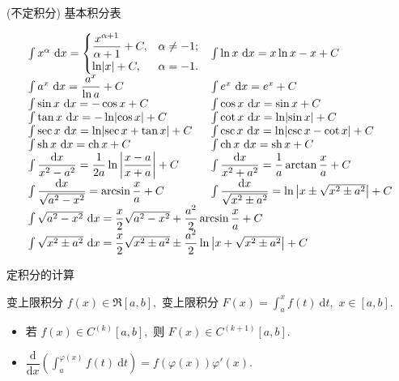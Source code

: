 \begin{frame}{(不定积分) 基本积分表}

{\smaller[2]
\[
\begin{array}{ll}
\int x^\alpha ~ \mathrm{d} x = \begin{cases}
\dfrac{x^{\alpha+1}}{\alpha+1} + C, & \alpha \neq -1;\\
\ln \lvert x \rvert + C, & \alpha = -1.
\end{cases} & \int \ln x ~ \mathrm{d} x = x \ln x - x + C \\
\int a^x ~ \mathrm{d} x = \dfrac{a^x}{\ln a} + C & \int e^x ~ \mathrm{d} x = e^x + C \\
\int \sin x ~ \mathrm{d} x = -\cos x + C & \int \cos x ~ \mathrm{d} x = \sin x + C \\
\int \tan x ~ \mathrm{d} x = -\ln \lvert \cos x \rvert + C & \int \cot x ~ \mathrm{d} x = \ln \lvert \sin x \rvert + C \\
\int \sec x ~ \mathrm{d} x = \ln \lvert \sec x + \tan x \rvert + C & \int \csc x ~ \mathrm{d} x = \ln \lvert \csc x - \cot x \rvert + C \\
\int \operatorname{sh} x ~ \mathrm{d} x = \operatorname{ch} x + C & \int \operatorname{ch} x ~ \mathrm{d} x = \operatorname{sh} x + C \\
\int \dfrac{\mathrm{d} x}{x^2 - a^2} = \dfrac{1}{2a} \ln \left\lvert \dfrac{x-a}{x+a} \right\rvert + C & \int \dfrac{\mathrm{d} x}{x^2+a^2} = \dfrac{1}{a} \arctan \dfrac{x}{a} + C \\
\int \dfrac{\mathrm{d} x}{\sqrt{a^2-x^2}} = \arcsin \dfrac{x}{a} + C & \int \dfrac{\mathrm{d} x}{\sqrt{x^2 \pm a^2}} = \ln \left\lvert x \pm \sqrt{x^2 \pm a^2} \right\rvert + C \\
\multicolumn{2}{l}{\int \sqrt{a^2 - x^2} ~ \mathrm{d} x = \dfrac{x}{2} \sqrt{a^2 - x^2} + \dfrac{a^2}{2} \arcsin \dfrac{x}{a} + C} \\
\multicolumn{2}{l}{\int \sqrt{x^2 \pm a^2} ~ \mathrm{d} x = \dfrac{x}{2} \sqrt{x^2 \pm a^2} \pm \dfrac{a^2}{2} \ln \left\lvert x + \sqrt{x^2 \pm a^2} \right\rvert + C}
\end{array}
\]
}

\end{frame}


\begin{frame}{定积分的计算}

\begin{block}{变上限积分}
$f(x) \in \mathfrak{R}[a, b],$ 变上限积分 $F(x) = \int_a^x f(t) ~ \mathrm{d} t,$ $x \in [a, b].$
\end{block}

\pause

\begin{itemize}[<+->]
\item 若 $f(x) \in C^{(k)}[a, b],$ 则 $F(x) \in C^{(k+1)}[a, b].$
\item $\dfrac{\mathrm{d}}{\mathrm{d} x} \left( \int_a^{\varphi(x)} f(t) ~ \mathrm{d} t \right) = f(\varphi(x)) \varphi'(x).$
\end{itemize}

\end{frame}

